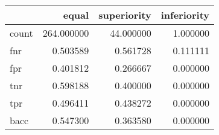 \begin{tabular}{lrrr}
\toprule
{} &       equal &  superiority &  inferiority \\
\midrule
count &  264.000000 &    44.000000 &     1.000000 \\
fnr   &    0.503589 &     0.561728 &     0.111111 \\
fpr   &    0.401812 &     0.266667 &     0.000000 \\
tnr   &    0.598188 &     0.400000 &     0.000000 \\
tpr   &    0.496411 &     0.438272 &     0.000000 \\
bacc  &    0.547300 &     0.363580 &     0.000000 \\
\bottomrule
\end{tabular}
